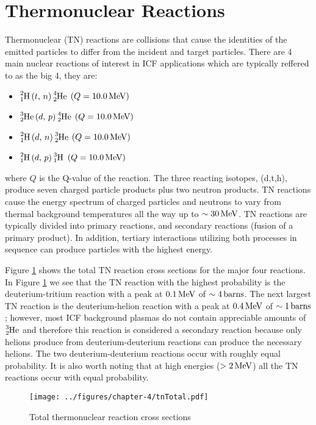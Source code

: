 \section{Thermonuclear Reactions}
Thermonuclear (TN) reactions are collisions that cause the identities of the emitted particles to differ from the incident and target particles. There are 4 main nuclear reactions of interest in ICF applications which are typically reffered to as the big 4, they are:
\begin{multicols}{2}
\begin{itemize}
    \item $\ce{^{2}_{1}H} \, (t, \, n)\, \ce{^{4}_{2}He}$  $(Q = 10.0 \,\text{MeV})$
    \item $\ce{^{3}_{2}He}\, (d, \, p)\, \ce{^{4}_{2}He}$  $(Q = 10.0 \,\text{MeV})$
    \item $\ce{^{2}_{1}H} \, (d, \, n)\, \ce{^{3}_{2}He}$  $(Q = 10.0 \,\text{MeV})$
    \item $\ce{^{2}_{1}H} \, (d, \, p)\, \ce{^{3}_{1}H}$   $(Q = 10.0 \,\text{MeV})$
\end{itemize}
\end{multicols}
where $Q$ is the Q-value of the reaction. The three reacting isotopes, (d,t,h), produce seven charged particle products plus two neutron products. TN reactions cause the energy spectrum of charged particles and neutrons to vary from thermal background temperatures all the way up to $\sim 30 \,\text{MeV}$. TN reactions are typically divided into primary reactions, and secondary reactions (fusion of a primary product). In addition, tertiary interactions utilizing both processes in sequence can produce particles with the highest energy.  

Figure \ref{fig:tnTotal} shows the total TN reaction cross sections for the major four reactions. In Figure \ref{fig:tnTotal} we see that the TN reaction with the highest probability is the deuterium-tritium reaction with a peak at $0.1 \,\text{MeV}$ of $\sim 4 \,\text{barns}$. The next largest TN reaction is the deuterium-helion reaction with a peak at $0.4 \,\text{MeV}$ of $\sim 1 \,\text{barns}$; however, most ICF background plasmas do not contain appreciable amounts of $\ce{^{3}_{2}He}$ and therefore this reaction is considered a secondary reaction because only helions produce from deuterium-deuterium reactions can produce the necessary helions. The two deuterium-deuterium reactions occur with roughly equal probability. It is also worth noting that at high energies ($> 2 \,\text{MeV}$) all the TN reactions occur with equal probability.

\begin{figure}[!htb]
    \centering
    \texttt{[image: ../figures/chapter-4/tnTotal.pdf]}
    \caption{Total thermonuclear reaction cross sections}
    \label{fig:tnTotal}
\end{figure}

